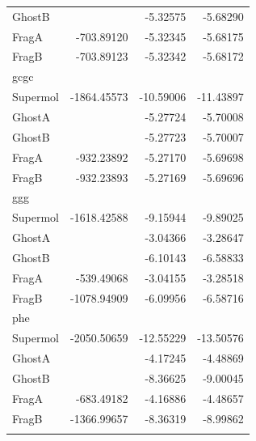\documentclass[journal=jctcce,manuscript=article]{achemso}
\begin{document}
\begin{spacing}{1}
\begin{longtable}[H]{lRRR}
    GhostB &       & -5.32575 & -5.68290 \\
    FragA & -703.89120 & -5.32345 & -5.68175 \\
    FragB & -703.89123 & -5.32342 & -5.68172 \\
    gcgc  &       &       &  \\
    Supermol & -1864.45573 & -10.59006 & -11.43897 \\
    GhostA &       & -5.27724 & -5.70008 \\
    GhostB &       & -5.27723 & -5.70007 \\
    FragA & -932.23892 & -5.27170 & -5.69698 \\
    FragB & -932.23893 & -5.27169 & -5.69696 \\
    ggg   &       &       &  \\
    Supermol & -1618.42588 & -9.15944 & -9.89025 \\
    GhostA &       & -3.04366 & -3.28647 \\
    GhostB &       & -6.10143 & -6.58833 \\
    FragA & -539.49068 & -3.04155 & -3.28518 \\
    FragB & -1078.94909 & -6.09956 & -6.58716 \\
    phe   &       &       &  \\
    Supermol & -2050.50659 & -12.55229 & -13.50576 \\
    GhostA &       & -4.17245 & -4.48869 \\
    GhostB &       & -8.36625 & -9.00045 \\
    FragA & -683.49182 & -4.16886 & -4.48657 \\
    FragB & -1366.99657 & -8.36319 & -8.99862 \\
  \label{tab:pbe_l7}
\end{longtable}


\end{spacing}
\end{document}
